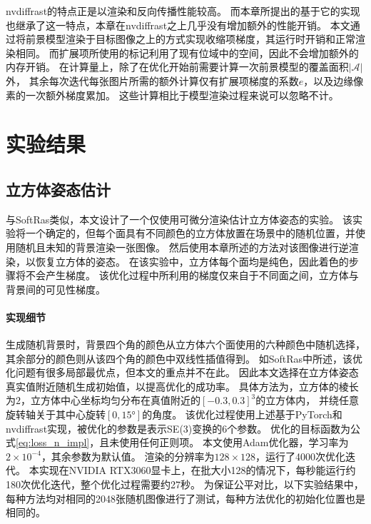nvdiffrast的特点正是以渲染和反向传播性能较高。
而本章所提出的基于它的实现也继承了这一特点，本章在nvdiffrast之上几乎没有增加额外的性能开销。
本文通过将前景模型渲染于目标图像之上的方式实现收缩项梯度，其运行时开销和正常渲染相同。
而扩展项所使用的标记利用了现有位域中的空间，因此不会增加额外的内存开销。
在计算量上，除了在优化开始前需要计算一次前景模型的覆盖面积$|\mathcal{A}|$外，
其余每次迭代每张图片所需的额外计算仅有扩展项梯度的系数$e$，以及边缘像素的一次额外梯度累加。
这些计算相比于模型渲染过程来说可以忽略不计。

\section{实验结果}

\subsection{立方体姿态估计}

与SoftRas\citep{softras}类似，本文设计了一个仅使用可微分渲染估计立方体姿态的实验。
该实验将一个确定的，但每个面具有不同颜色的立方体放置在场景中的随机位置，并使用随机且未知的背景渲染一张图像。
然后使用本章所述的方法对该图像进行逆渲染，以恢复立方体的姿态。
在该实验中，立方体每个面均是纯色，因此着色的步骤将不会产生梯度。
该优化过程中所利用的梯度仅来自于不同面之间，立方体与背景间的可见性梯度。

\paragraph{实现细节}
生成随机背景时，背景四个角的颜色从立方体六个面使用的六种颜色中随机选择，
其余部分的颜色则从该四个角的颜色中双线性插值得到。
如SoftRas中所述，该优化问题有很多局部最优点，但本文的重点并不在此。
因此本文选择在立方体姿态真实值附近随机生成初始值，以提高优化的成功率。
具体方法为，立方体的棱长为$2$，立方体中心坐标均匀分布在真值附近的$[-0.3,0.3]^3$的立方体内，
并绕任意旋转轴关于其中心旋转$[0,15°]$的角度。
该优化过程使用上述基于PyTorch\citep{pytorch}和nvdiffrast实现，被优化的参数是表示SE(3)变换的6个参数。
优化的目标函数为公式\eqref{eq:loss_n_impl}，且未使用任何正则项。
本文使用Adam\citep{adam}优化器，学习率为$2\times 10^{-4}$，其余参数为默认值。
渲染的分辨率为$128\times128$，运行了4000次优化迭代。
本实现在NVIDIA RTX3060显卡上，在批大小128的情况下，每秒能运行约180次优化迭代，整个优化过程需要约27秒。
为保证公平对比，以下实验结果中，每种方法均对相同的2048张随机图像进行了测试，每种方法优化的初始化位置也是相同的。

